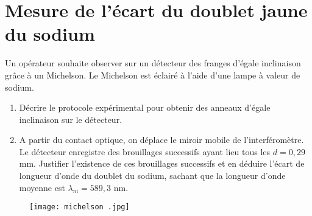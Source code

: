 \documentclass{article}
\begin{document}
\section{Mesure de l'écart du doublet jaune du sodium}


Un opérateur souhaite observer sur un détecteur des franges d'égale inclinaison grâce à un Michelson. 
Le Michelson est éclairé à l'aide d'une lampe à valeur de sodium. 
\begin{enumerate}
  \item Décrire le protocole expérimental pour obtenir des anneaux d'égale inclinaison sur le détecteur. 
  \item A partir du contact optique, on déplace le miroir mobile de l'interféromètre. Le détecteur enregistre des brouillages successifs ayant lieu tous les $d=0,29$mm. Justifier l'existence de ces brouillages successifs et en déduire l'écart de longueur d'onde du doublet du sodium, sachant que la longueur d'onde moyenne est $\lambda_m = 589,3$ nm. \\[1.5cm]
\end{enumerate}

\begin{figure}[h]
  \centering
  \texttt{[image: michelson .jpg]}

  
\end{figure}
\end{document}
